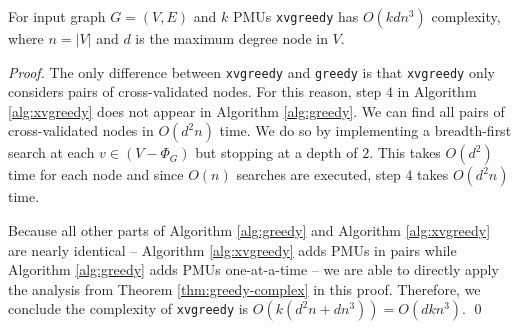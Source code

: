 \begin{theorem}
For input graph $G=(V,E)$ and $k$ PMUs {\tt xvgreedy} has $O(kdn^3)$ complexity, where $n=|V|$ and $d$ is the maximum degree node in $V$.
\label{thm:xvgreedy-complex}
\end{theorem}
\begin{proof}
	The only difference between {\tt xvgreedy} and {\tt greedy} is that {\tt xvgreedy} only considers pairs of cross-validated nodes. For this reason, 
	step $4$ in Algorithm \ref{alg:xvgreedy} does not appear in Algorithm \ref{alg:greedy}.  We can find all pairs of cross-validated nodes in $O(d^2n)$ time.  We do so by 
	implementing a breadth-first search at each $v \in (V - \Phi_G)$ but stopping at a depth of $2$.  This takes $O(d^2)$ time for each node and since 
	$O(n)$ searches are executed, step $4$ takes $O(d^2n)$ time.

	Because all other parts of Algorithm \ref{alg:greedy} and Algorithm \ref{alg:xvgreedy} are nearly identical -- Algorithm \ref{alg:xvgreedy}
	adds PMUs in pairs while Algorithm \ref{alg:greedy} adds PMUs one-at-a-time -- we are able to directly apply
	the analysis from Theorem \ref{thm:greedy-complex} in this proof.  Therefore, we conclude the complexity of {\tt xvgreedy} is $O(k(d^2n + dn^3)) = O(dkn^3)$. \qed
\end{proof}







%
%

